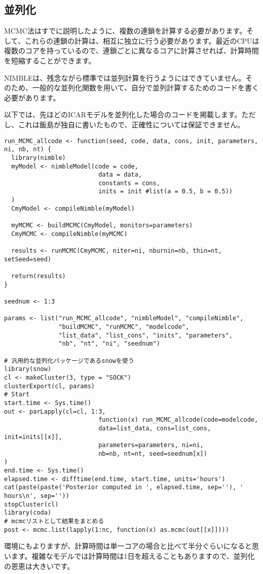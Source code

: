 	\subsection{並列化}
MCMC法はすでに説明したように、複数の連鎖を計算する必要があります。そして、これらの連鎖の計算は、相互に独立に行う必要があります。最近のCPUは複数のコアを持っているので、連鎖ごとに異なるコアに計算させれば、計算時間を短縮することができます。

NIMBLEは、残念ながら標準では並列計算を行うようにはできていません。そのため、一般的な並列化関数を用いて、自分で並列計算するためのコードを書く必要があります。

以下では、先ほどのICARモデルを並列化した場合のコードを掲載します。ただし、これは飯島が独自に書いたもので、正確性については保証できません。
\begin{verbatim}
run_MCMC_allcode <- function(seed, code, data, cons, init, parameters, ni, nb, nt) {
  library(nimble)
  myModel <- nimbleModel(code = code,
                          data = data,
                          constants = cons,
                          inits = init #list(a = 0.5, b = 0.5))
  )
  CmyModel <- compileNimble(myModel)

  myMCMC <- buildMCMC(CmyModel, monitors=parameters)
  CmyMCMC <- compileNimble(myMCMC)

  results <- runMCMC(CmyMCMC, niter=ni, nburnin=nb, thin=nt, setSeed=seed)

  return(results)
}

seednum <- 1:3

params <- list("run_MCMC_allcode", "nimbleModel", "compileNimble",
               "buildMCMC", "runMCMC", "modelcode",
               "list_data", "list_cons", "inits", "parameters",
               "nb", "nt", "ni", "seednum")

# 汎用的な並列化パッケージであるsnowを使う
library(snow)
cl <- makeCluster(3, type = "SOCK")
clusterExport(cl, params)
# Start
start.time <- Sys.time()
out <- parLapply(cl=cl, 1:3,
                          function(x) run_MCMC_allcode(code=modelcode,
                          data=list_data, cons=list_cons, init=inits[[x]],
                          parameters=parameters, ni=ni,
                          nb=nb, nt=nt, seed=seednum[x])
)
end.time <- Sys.time()
elapsed.time <- difftime(end.time, start.time, units='hours')
cat(paste(paste('Posterior computed in ', elapsed.time, sep=''), ' hours\n', sep=''))
stopCluster(cl)
library(coda)
# mcmcリストとして結果をまとめる
post <- mcmc.list(lapply(1:nc, function(x) as.mcmc(out[[x]])))
\end{verbatim}
環境にもよりますが、計算時間は単一コアの場合と比べて半分ぐらいになると思います。複雑なモデルでは計算時間は1日を超えることもありますので、並列化の恩恵は大きいです。

